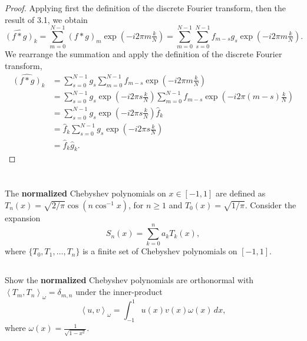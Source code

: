 \documentclass[12pt]{article}
\newenvironment{problem}
    {\begin{lrbox}{\mybox}\begin{minipage}{0.98\textwidth}}
    {\end{minipage}\end{lrbox}\framebox[\textwidth]{\usebox{\mybox}}}
\newcommand{\<}{\left\langle}
\renewcommand{\>}{\right\rangle}
\newcommand{\expp}[1]{\exp\!\left( #1 \right)}
\begin{document}
\begin{proof}
    Applying first the definition of the discrete Fourier transform, then the result of 3.1, we obtain
    \[
        \widehat{(f * g)}_k
            = \sum_{m=0}^{N-1} (f * g)_m \expp{-i2\pi m \tfrac{k}{N}}
            = \sum_{m=0}^{N-1} \sum_{s=0}^{N-1} f_{m-s} g_s \expp{-i2\pi m \tfrac{k}{N}}.
    \]
    We rearrange the summation and apply the definition of the discrete Fourier transform,
    \begin{align*}
        \widehat{(f * g)}_k
            &= \sum_{s=0}^{N-1} g_s \sum_{m=0}^{N-1} f_{m-s} \expp{-i2\pi m \tfrac{k}{N}} \\[1em]
            &= \sum_{s=0}^{N-1} g_s \expp{-i2\pi s \tfrac{k}{N}} 
                \sum_{m=0}^{N-1} f_{m-s} \expp{-i2\pi (m - s) \tfrac{k}{N}} \\[1em]
            &= \sum_{s=0}^{N-1} g_s \expp{-i2\pi s \tfrac{k}{N}} \widehat{f}_k \\[1em]
            &= \widehat{f}_k \sum_{s=0}^{N-1} g_s \expp{-i2\pi s \tfrac{k}{N}} \\[1em]
            &= \widehat{f}_k \widehat{g}_k.
    \end{align*}
    
\end{proof}

\section{}
\begin{problem}
    The \textbf{normalized} Chebyshev polynomials on $x \in [-1, 1]$ are defined as $T_n(x) = \sqrt{2/\pi} \cos(n \cos^{-1} x)$, for $n \geq 1$ and $T_0(x) = \sqrt{1/\pi}$. Consider the expansion
    \[
        S_n(x) = \sum_{k=0}^n a_k T_k(x),
    \]
    where $\{T_0, T_1, \dots, T_n\}$ is a finite set of Chebyshev polynomials on $[-1, 1]$.
\end{problem}

\subsection{}
\begin{problem}
    Show the \textbf{normalized} Chebyshev polynomials are orthonormal with $\< T_m, T_n\>_\omega = \delta_{m,n}$ under the inner-product
    \[
        \<u, v\>_\omega = \int_{-1}^1 u(x) v(x) \omega(x) \,dx,
    \]
    where $\omega(x) = \frac{1}{\sqrt{1- x^2}}$.
\end{problem}
\end{document}
